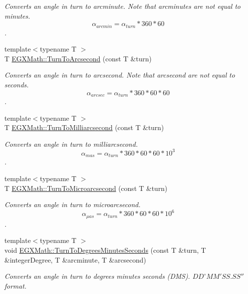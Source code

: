 \begin{DoxyCompactItemize}
\begin{DoxyCompactList}\small\item\em Converts an angle in turn to arcminute. Note that arcminutes are not equal to minutes. \[\alpha_{arcmin}=\alpha_{turn} * 360 * 60\]. \end{DoxyCompactList}\item 
{\footnotesize template$<$typename T $>$ }\\T \mbox{\hyperlink{group___e_g_x_math-_angle_conversions-_turn_gaad072969abc59ef6f5b63ac6a176a11b}{E\+G\+X\+Math\+::\+Turn\+To\+Arcsecond}} (const T \&turn)
\begin{DoxyCompactList}\small\item\em Converts an angle in turn to arcsecond. Note that arcsecond are not equal to seconds. \[\alpha_{arcsec}=\alpha_{turn} * 360 * 60 * 60\]. \end{DoxyCompactList}\item 
{\footnotesize template$<$typename T $>$ }\\T \mbox{\hyperlink{group___e_g_x_math-_angle_conversions-_turn_ga05d6fea8f8475831e93dd23f6196393f}{E\+G\+X\+Math\+::\+Turn\+To\+Milliarcsecond}} (const T \&turn)
\begin{DoxyCompactList}\small\item\em Converts an angle in turn to milliarcsecond. \[\alpha_{mas}=\alpha_{turn}* 360 * 60 * 60 * 10^3\]. \end{DoxyCompactList}\item 
{\footnotesize template$<$typename T $>$ }\\T \mbox{\hyperlink{group___e_g_x_math-_angle_conversions-_turn_ga41a861a04d65aab05647b32142e6d80d}{E\+G\+X\+Math\+::\+Turn\+To\+Microarcsecond}} (const T \&turn)
\begin{DoxyCompactList}\small\item\em Converts an angle in turn to microarcsecond. \[\alpha_{\mu as}=\alpha_{turn} * 360 * 60 * 60 * 10^6\]. \end{DoxyCompactList}\item 
{\footnotesize template$<$typename T $>$ }\\void \mbox{\hyperlink{group___e_g_x_math-_angle_conversions-_turn_gaefdee18d878c2e66e7bd737c8900ab30}{E\+G\+X\+Math\+::\+Turn\+To\+Degrees\+Minutes\+Seconds}} (const T \&turn, T \&integer\+Degree, T \&arcminute, T \&arcsecond)
\begin{DoxyCompactList}\small\item\em Converts an angle in turn to degrees minutes seconds (D\+MS). ${DD}^{\circ}{MM}'{SS.SS}''$ format. \end{DoxyCompactList}\item 

\end{DoxyCompactItemize}
